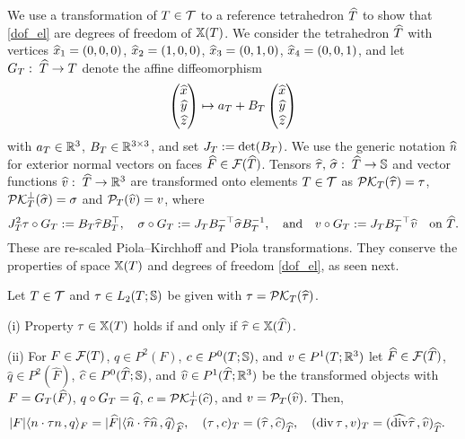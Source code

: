 \documentclass[11pt]{article}
\begin{document}
We use a transformation of $T\in\mathcal{T}$ to a reference tetrahedron ${\widehat T}$
to show that \eqref{dof_el} are degrees of freedom of $\mathbb{X}(T)$.
We consider the tetrahedron ${\widehat T}$ with vertices
${\widehat x}_1=(0,0,0)$, ${\widehat x}_2=(1,0,0)$, ${\widehat x}_3=(0,1,0)$, ${\widehat x}_4=(0,0,1)$,
and let $G_T:\;{\widehat T}\to T$ denote the affine diffeomorphism
\[
   \begin{pmatrix}{\widehat x}\\ {\widehat y}\\ {\widehat z}\end{pmatrix} \mapsto
   a_T + B_T \begin{pmatrix}{\widehat x}\\ {\widehat y}\\ {\widehat z}\end{pmatrix}
\]
with $a_T\in\mathbb{R}^3$, $B_T\in\mathbb{R}^{3\times 3}$, and set $J_T:=\det(B_T)$.
We use the generic notation ${\widehat n}$ for exterior normal vectors
on faces ${\widehat F}\in\mathcal{F}({\widehat T})$.
Tensors ${\widehat\tau},\,{\widehat\sigma}:\;{\widehat T}\to\mathbb{S}$ and vector functions ${\widehat v}:\;{\widehat T}\to\mathbb{R}^3$
are transformed onto elements $T\in\mathcal{T}$ as
$\mathcal{PK}_{{T}}({\widehat\tau})=\tau$,
$\mathcal{PK}^\perp_{{T}}({\widehat\sigma})=\sigma$ and $\mathcal{P}_{T}({\widehat v})=v$, where
\[
   J_T^2\tau\circ G_T := B_T{\widehat\tau} B_T^\top,\quad
   \sigma\circ G_T := J_T B_T^{-\top}{\widehat\sigma} B_T^{-1},
   \quad\text{and}\quad
   v\circ G_T:=J_T B_T^{-\top}{\widehat v}
   \quad\text{on}\ {\widehat T}.
\]
These are re-scaled Piola--Kirchhoff and Piola transformations.
They conserve the properties of space $\mathbb{X}(T)$ and degrees of freedom
\eqref{dof_el}, as seen next.

\begin{lemma} \label{la_trafo}
Let $T\in\mathcal{T}$ and $\tau\in L_2(T;\mathbb{S})$ be given with $\tau=\mathcal{PK}_{{T}}({\widehat\tau})$.

(i) Property $\tau\in\mathbb{X}(T)$ holds if and only if ${\widehat\tau}\in\mathbb{X}({\widehat T})$.

(ii) For $F\in\mathcal{F}(T)$, $q\in P^2(F)$, $c\in P^0(T;\mathbb{S})$, and $v\in P^1(T;\mathbb{R}^3)$ let
     ${\widehat F}\in\mathcal{F}({\widehat T})$, $\widehat q\in P^2(\widehat F)$, $\widehat c\in P^0({\widehat T};\mathbb{S})$, and
     $\widehat v\in P^1({\widehat T};\mathbb{R}^3)$ be the transformed objects with
     $F=G_T({\widehat F})$, $q\circ G_T=\widehat q$, $c=\mathcal{PK}^\perp_{{T}}(\widehat c)$,
     and $v=\mathcal{P}_{T}({\widehat v})$. Then,
\begin{align*}
   &|F|\langle{}n\cdot\tau n\hspace*{.5mm},q\rangle_{F}
   = |{\widehat F}|\langle{}{\widehat n}\cdot{\widehat\tau}{\widehat n}\hspace*{.5mm},\widehat q\rangle_{{\widehat F}},\quad
   (\tau\hspace*{.5mm},c)_{T}=({\widehat\tau}\hspace*{.5mm},\widehat c)_{\widehat T},\quad
   (\operatorname{div}\tau\hspace*{.5mm},v)_{T}=(\widehat{\operatorname{div}}{\widehat\tau}\hspace*{.5mm},{\widehat v})_{\widehat T}.
\end{align*}
\end{lemma}
\end{document}
